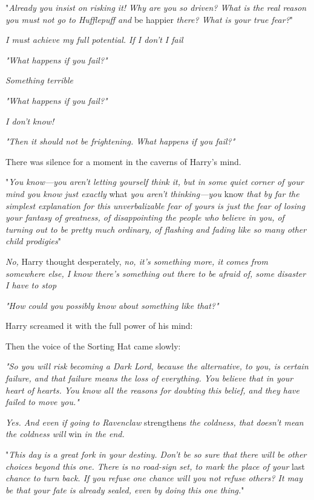 "\emph{Already you insist on risking it! Why are you so driven? What is the
real reason you must not go to Hufflepuff and} be happier \emph{there? What is
your true fear?}"

\emph{I must achieve my full potential. If I don't I{\el} fail{\el}}

\emph{"What happens if you fail?"}

\emph{Something terrible{\el}}

\emph{"What happens if you fail?"}

\emph{I don't know!}

\emph{"Then it should not be frightening. What happens if you fail?"}

\emph{}

There was silence for a moment in the caverns of Harry's mind.

"\emph{You know---you aren't letting yourself think it, but in some quiet
corner of your mind you know just exactly} what \emph{you aren't
thinking---you} know \emph{that by far the simplest explanation for this
unverbalizable fear of yours is just the fear of losing your fantasy of
greatness, of disappointing the people who believe in you, of turning out to be
pretty much ordinary, of flashing and fading like so many other child
prodigies{\el}}"

\emph{No,} Harry thought desperately, \emph{no, it's something more, it comes
from somewhere else, I know there's something out there to be afraid of, some
disaster I have to stop{\el}}

\emph{"How could you possibly know about something like that?"}

Harry screamed it with the full power of his mind: \emph{}

Then the voice of the Sorting Hat came slowly:

\emph{"So you will risk becoming a Dark Lord, because the alternative, to you,
is certain failure, and that failure means the loss of everything. You believe
that in your heart of hearts. You know all the reasons for doubting this
belief, and they have failed to move you."}

\emph{Yes. And even if going to Ravenclaw} strengthens \emph{the coldness, that
doesn't mean the coldness will} win \emph{in the end.}

"\emph{This day is a great fork in your destiny. Don't be so sure that there
will be other choices beyond this one. There is no road-sign set, to mark the
place of your} last \emph{chance to turn back. If you refuse one chance will
you not refuse others? It may be that your fate is already sealed, even by
doing this one thing.}"

